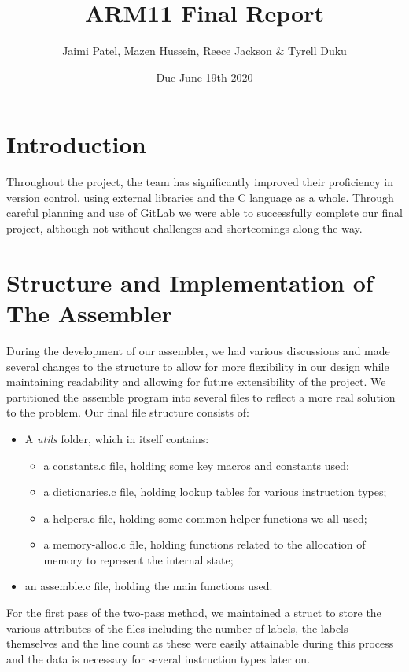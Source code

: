 \documentclass{article}
\title{ARM11 Final Report}
\author{Jaimi Patel, Mazen Hussein, Reece Jackson & Tyrell Duku }
\date{Due June 19th 2020}
\begin{document}
\maketitle

\section{Introduction}
Throughout the project, the team has significantly improved their proficiency in version control, using external libraries and the C language as a whole. Through careful planning and use of GitLab we were able to successfully complete our final project, although not without challenges and shortcomings along the way.

\section{Structure and Implementation of The Assembler}
During the development of our assembler, we had various discussions and made several changes to the structure to allow for more flexibility in our design while maintaining readability and allowing for future extensibility of the project. We partitioned the assemble program into several files to reflect a more real solution to the problem. Our final file structure consists of: \begin{itemize}
    \item A \textit{utils} folder, which in itself contains: \begin{itemize}
        \item a constants.c file, holding some key macros and constants used;
        \item a dictionaries.c file, holding lookup tables for various instruction types;
        \item a helpers.c file, holding some common helper functions we all used;
        \item a memory-alloc.c file, holding functions related to the allocation of memory to represent the internal state;
    \end{itemize}
    \item an assemble.c file, holding the main functions used.
\end{itemize}

For the first pass of the two-pass method, we maintained a struct to store the various attributes of the files including the number of labels, the labels themselves and the line count as these were easily attainable during this process and the data is necessary for several instruction types later on.
\end{document}
